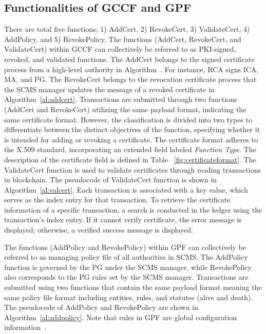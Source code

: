 \subsection{Functionalities of GCCF and GPF} 
There are total five functions; 1) AddCert, 2) RevokeCert, 3) ValidateCert, 4) AddPolicy, and 5) RevokePolicy. The functions (AddCert, RevokeCert, and ValidateCert) within GCCF can collectively be referred to as PKI-signed, revoked, and validated functions. The AddCert belongs to the signed certificate process from a high-level authority in Algorithm~. For instance, RCA signs ICA, MA, and PG. The RevokeCert belongs to the revocation certificate process that the SCMS manager updates the message of a revoked certificate in Algorithm~\ref{al:addcert}. Transactions are submitted through two functions (AddCert and RevokeCert) utilizing the same payload format, indicating the same certificate format. However, the classification is divided into two types to differentiate between the distinct objectives of the function, specifying whether it is intended for adding or revoking a certificate. The certificate format adheres to the X.509 standard, incorporating an extended field labeled \emph{Function Type}. The description of the certificate field is defined in Table ~\ref{fig:certificateformat}. The ValidateCert function is used to validate certificates through reading transactions in blockchain. The pseudocode of ValidateCert function is shown in Algorithm~\ref{al:valcert}. Each transaction is associated with a key value, which serves as the index entry for that transaction. To retrieve the certificate information of a specific transaction, a search is conducted in the ledger using the transaction's index entry. If it cannot verify certificate, the error message is displayed; otherwise, a verified success message is displayed.    

The functions (AddPolicy and RevokePolicy) within GPF can collectively be referred to as managing policy file of all authorities in SCMS. The AddPolicy function is governed by the PG under the SCMS manager, while RevokePolicy also corresponds to the PG rules set by the SCMS manager. Transactions are submitted using two functions that contain the same payload format meaning the same policy file format including entities, rules, and statutes (alive and death). The pseudocode of AddPolicy and RevokePolicy are shown in Algorithm~\ref{al:addpolicy}. Note that rules in GPF are global configuration information~\cite{brecht2018security}.   



